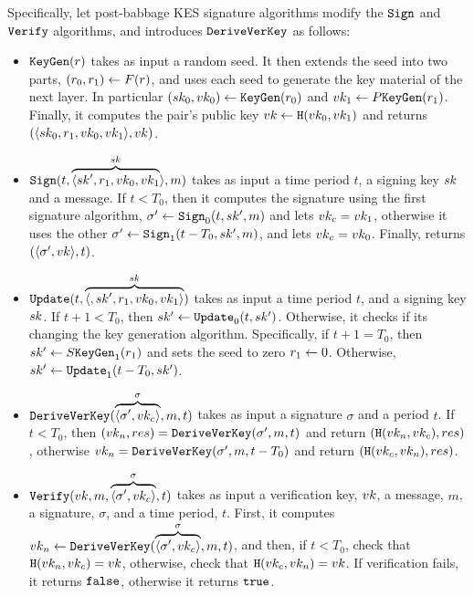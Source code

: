 Specifically, let post-babbage KES signature algorithms modify the $\texttt{Sign}$ and $\texttt{Verify}$ algorithms, and introduces
$\texttt{DeriveVerKey}$ as follows:
\begin{itemize}
    \item $\texttt{KeyGen}(r)$ takes as input a random seed. It then extends the seed into two parts,
    $(r_0, r_1)\gets F(r)$, and uses each seed to generate the key material of the next layer. In
    particular $(sk_0, vk_0)\gets\texttt{KeyGen}(r_0)$ and $vk_1\gets P\texttt{KeyGen}(r_1)$. Finally, it computes
    the pair's public key $vk\gets\texttt{H}(vk_0, vk_1)$ and returns $(\langle sk_0, r_1, vk_0,
    vk_1\rangle, vk)$.
    \item $\texttt{Sign}(t, \overbrace{\langle sk', r_1, vk_0, vk_1}^{sk}\rangle, m)$
    takes as input a time period $t$, a signing key $sk$ and a message. If $t<T_0$, then it computes the
    signature using the first signature algorithm, $\sigma'\gets\texttt{Sign}_0(t, sk', m)$ and lets $vk_c = vk_1$,
    otherwise it uses the other $\sigma'\gets\texttt{Sign}_1(t - T_0, sk', m)$, and lets $vk_c = vk_0$. Finally,
    returns $(\langle\sigma', vk\rangle,t)$.
    \item $\texttt{Update}(t, \overbrace{\langle, sk', r_1, vk_0, vk_1\rangle}^{sk})$ takes as input
    a time period $t$, and a signing key $sk$. If $t+1<T_0$, then $sk'\gets\texttt{Update}_0(t,
    sk')$. Otherwise, it checks if its changing the key
    generation algorithm. Specifically, if $t+1=T_0$, then $sk'\gets S\texttt{KeyGen}_1(r_1)$ and sets the seed
    to zero $r_1\gets 0$. Otherwise, $sk'\gets\texttt{Update}_1(t-T_0, sk')$.
    \item $\texttt{DeriveVerKey}(\overbrace{\langle\sigma', vk_c\rangle}^{\sigma}, m, t)$ takes as input a signature $\sigma$ and a
    period $t$. If $t<T_0$, then $(vk_n, res) = \texttt{DeriveVerKey}(\sigma', m, t)$ and return $(\texttt{H}(vk_n, vk_c), res)$,
    otherwise $vk_n = \texttt{DeriveVerKey}(\sigma', m, t - T_0)$ and return $(\texttt{H}(vk_c, vk_n), res)$.
    \item $\texttt{Verify}(vk, m, \overbrace{\langle\sigma', vk_c\rangle}^{\sigma},  t)$ takes as input
    a verification key, $vk$, a message, $m$, a signature, $\sigma$, and a time period, $t$. First, it
    computes $vk_n\gets\texttt{DeriveVerKey}(\overbrace{\langle\sigma', vk_c\rangle}^{\sigma}, m, t)$, and then, if
    $t<T_0$, check that $\texttt{H}(vk_n, vk_c) = vk$, otherwise, check that $\texttt{H}(vk_c, vk_n) = vk$. If verification
    fails, it returns $\texttt{false}$, otherwise it returns $\texttt{true}$.
\end{itemize}

